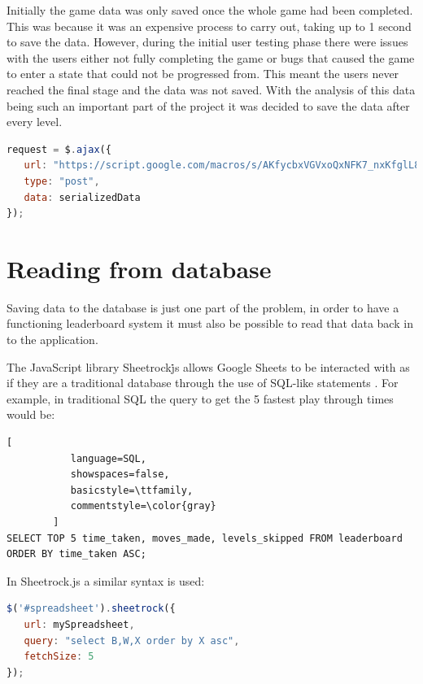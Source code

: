 \documentclass[12pt,a4paper]{report}
\begin{document}
Initially the game data was only saved once the whole game had been completed. This was because it was an expensive process to carry out, taking up to 1 second to save the data. However, during the initial user testing phase there were issues with the users either not fully completing the game or bugs that caused the game to enter a state that could not be progressed from. This meant the users never reached the final stage and the data was not saved. With the analysis of this data being such an important part of the project it was decided to save the data after every level.

\begin{minipage}{\linewidth}
\begin{lstlisting}[language=JavaScript]
request = $.ajax({
   url: "https://script.google.com/macros/s/AKfycbxVGVxoQxNFK7_nxKfglL8yLNUmdPwP2e9j8IMO6JY5wzLEdSE/exec",
   type: "post",
   data: serializedData
});
\end{lstlisting}
\end{minipage}

\section{Reading from database}
Saving data to the database is just one part of the problem, in order to have a functioning leaderboard system it must also be possible to read that data back in to the application.

The JavaScript library Sheetrock\.js allows Google Sheets to be interacted with as if they are a traditional database through the use of SQL-like statements \citep{sheetrock}.
For example, in traditional SQL the query to get the 5 fastest play through times would be:

\begin{minipage}{\linewidth}
\begin{lstlisting}[
           language=SQL,
           showspaces=false,
           basicstyle=\ttfamily,
           commentstyle=\color{gray}
        ]
SELECT TOP 5 time_taken, moves_made, levels_skipped FROM leaderboard ORDER BY time_taken ASC;
\end{lstlisting}
\end{minipage}

In Sheetrock.js a similar syntax is used:

\begin{minipage}{\linewidth}
\begin{lstlisting}[language=JavaScript]
$('#spreadsheet').sheetrock({
   url: mySpreadsheet,
   query: "select B,W,X order by X asc",
   fetchSize: 5
});
\end{lstlisting}
\end{minipage}
\end{document}
